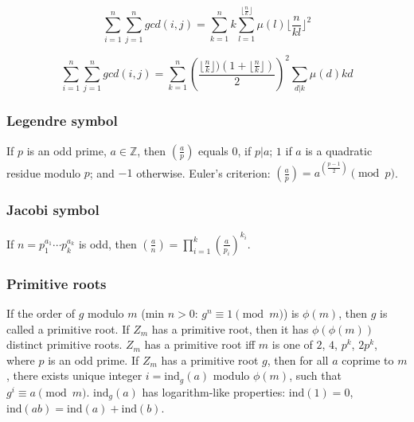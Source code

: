 \[ \sum_{i = 1}^n \sum_{j = 1}^n gcd(i, j) = \sum_{k = 1}^n k \sum_{l = 1}^{\lfloor \frac{n}{k} \rfloor} \mu(l) \lfloor {\frac{n}{kl}} \rfloor^2 \]

\[ \sum_{i = 1}^n \sum_{j = 1}^n gcd(i, j) = \sum_{k = 1}^n (\frac{\lfloor \frac{n}{k} \rfloor) (1 + \lfloor \frac{n}{k} \rfloor) }{2})^2 \sum_{d | k} \mu (d) kd \]

\subsubsection{Legendre symbol} If $p$ is an odd prime, $a \in {\mathbb Z}$, then
$\left(\frac{a}{p}\right)$ equals $0$, if $p | a$; $1$ if $a$ is a quadratic
residue modulo $p$; and $-1$ otherwise.
Euler's criterion:
$\left(\frac{a}{p}\right)=a^{\left(\frac{p-1}{2}\right)} \pmod p$. \\
\subsubsection{Jacobi symbol}  %
If $n=p_1^{a_1} \cdots p_k^{a_k}$ is odd, then
$\left(\frac{a}{n}\right) = \prod_{i=1}^k \left(\frac{a}{p_i}\right)^{k_i}$.


\subsubsection{Primitive roots}  If the order of $g$ modulo $m$ (min $n>0$:
$g^n \equiv 1 \pmod{m}$) is $\phi(m)$, then $g$ is called a primitive root.
If $Z_m$ has a primitive root, then it has $\phi(\phi(m))$ distinct primitive
roots. $Z_m$ has a primitive root iff $m$ is one of $2$, $4$,
$p^k$, $2p^k$, where $p$ is an odd prime.
If $Z_m$ has a primitive root $g$, then for all $a$ coprime to $m$,
there exists unique integer $i=\text{ind}_g(a)$ modulo $\phi(m)$,
such that $g^i \equiv a \pmod{m}$.
$\text{ind}_g(a)$ has logarithm-like properties:
$\text{ind}(1) = 0$, $\text{ind}(ab) = \text{ind}(a) + \text{ind}(b)$.

